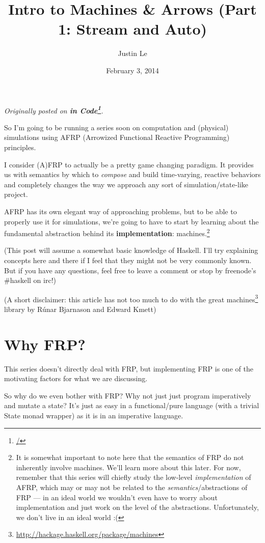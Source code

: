 \documentclass[]{article}
\title{Intro to Machines \& Arrows (Part 1: Stream and Auto)}
\author{Justin Le}
\date{February 3, 2014}
\renewcommand{\href}[2]{#2\footnote{\url{#1}}}
\begin{document}
\maketitle

\emph{Originally posted on \textbf{\href{/}{in Code}}.}

So I'm going to be running a series soon on computation and (physical)
simulations using AFRP (Arrowized Functional Reactive Programming)
principles.

I consider (A)FRP to actually be a pretty game changing paradigm. It
provides us with semantics by which to \emph{compose} and build
time-varying, reactive behaviors and completely changes the way we
approach any sort of simulation/state-like project.

AFRP has its own elegant way of approaching problems, but to be able to
properly use it for simulations, we're going to have to start by
learning about the fundamental abstraction behind its
\textbf{implementation}: machines.\footnote{It is somewhat important to
  note here that the semantics of FRP do not inherently involve
  machines. We'll learn more about this later. For now, remember that
  this series will chiefly study the low-level \emph{implementation} of
  AFRP, which may or may not be related to the
  \emph{semantics}/abstractions of FRP --- in an ideal world we wouldn't
  even have to worry about implementation and just work on the level of
  the abstractions. Unfortunately, we don't live in an ideal world :(}

(This post will assume a somewhat basic knowledge of Haskell. I'll try
explaining concepts here and there if I feel that they might not be very
commonly known. But if you have any questions, feel free to leave a
comment or stop by freenode's \#haskell on irc!)

(A short disclaimer: this article has not too much to do with the great
\href{http://hackage.haskell.org/package/machines}{machines} library by
Rúnar Bjarnason and Edward Kmett)

\section{Why FRP?}\label{why-frp}

This series doesn't directly deal with FRP, but implementing FRP is one
of the motivating factors for what we are discussing.

So why do we even bother with FRP? Why not just just program
imperatively and mutate a state? It's just as easy in a functional/pure
language (with a trivial State monad wrapper) as it is in an imperative
language.
\end{document}
